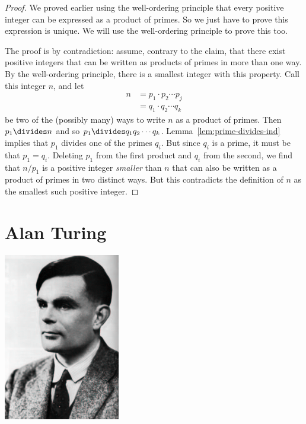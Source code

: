 \begin{proof}
We proved earlier using the well-ordering principle that every positive
integer can be expressed as a product of primes.  So we just have to prove
this expression is unique.  We will use the well-ordering principle to
prove this too.

The proof is by contradiction: assume, contrary to the claim, that there
exist positive integers that can be written as products of primes in more
than one way.  By the well-ordering principle, there is a smallest integer
with this property.  Call this integer $n$, and let
%
\begin{align*}
n & = p_1 \cdot p_2 \cdots p_j \\
  & = q_1 \cdot q_2 \cdots q_k
\end{align*}
%
be two of the (possibly many) ways to write $n$ as a product of
primes.  Then $p_1 \divides n$ and so $p_1 \divides q_1 q_2 \cdots q_k$.
Lemma~\ref{lem:prime-divides-ind} implies that $p_1$ divides one of
the primes $q_i$.  But since $q_i$ is a prime, it must be that $p_1 =
q_i$.  Deleting $p_1$ from the first product and $q_i$ from the
second, we find that $n / p_1$ is a positive integer \emph{smaller}
than $n$ that can also be written as a product of primes in two
distinct ways.  But this contradicts the definition of $n$ as the
smallest such positive integer.
\end{proof}



\section{Alan Turing}

\centerline{\includegraphics[width=2in]{figures/turing.pdf}}

